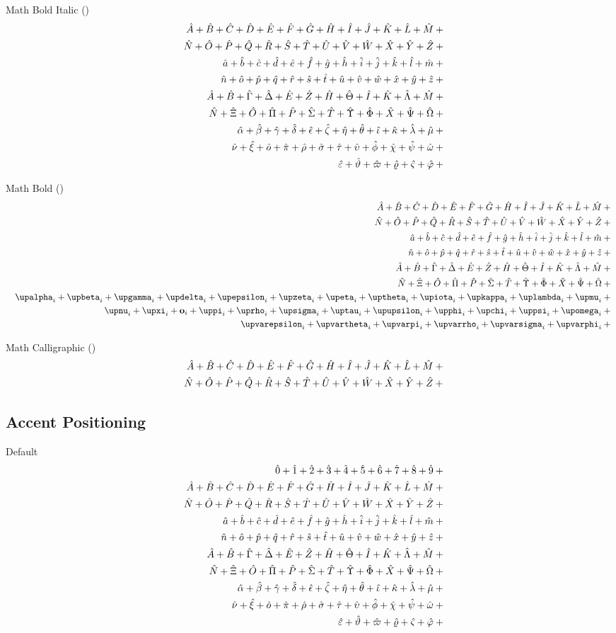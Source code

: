 \documentclass[11pt, a4paper, oneside]{article}
\theoremstyle{Plain}
\theoremstyle{Definition}
\theoremstyle{Remark}
\begin{document}
\begin{appendix}
	Math Bold Italic (\texttt{\string\bm})
	\def\test#1{\bm{#1}_{i}+{}}%
	\begin{eqnarray*}
	  && {\testupperi}\\
	  && {\testupperii}\\
	  && {\testloweri}\\
	  && {\testlowerii}\\
	  && {\testupgreeki}\\
	  && {\testupgreekii}\\
	  && {\testlowgreeki}\\
	  && {\testlowgreekii}\\
	  && {\testlowgreekiii}
	\end{eqnarray*}

	Math Bold (\texttt{\string\mathbf})
	\def\test#1{\mathbf{#1}_{i}+{}}%
	\begin{eqnarray*}
	  && {\testupperi}\\
	  && {\testupperii}\\
	  && {\testloweri}\\
	  && {\testlowerii}\\
	  && {\testupgreeki}\\
	  && {\testupgreekii}\\
	  && {\def\test#1{\bm{\mathbf{#1}}_{i}+{}}\testlowgreekupi}\\
	  && {\def\test#1{\bm{\mathbf{#1}}_{i}+{}}\testlowgreekupii}\\
	  && {\def\test#1{\bm{\mathbf{#1}}_{i}+{}}\testlowgreekupiii}
	\end{eqnarray*}%

	Math Calligraphic (\texttt{\string\mathcal})
	\def\test#1{\mathcal{#1}_{i}+{}}%
	\begin{eqnarray*}
	  && {\testupperi}\\
	  && {\testupperii}
	\end{eqnarray*}%

	\subsection{Accent Positioning \showfamily}

	Default
	\def\test#1{\hat{#1}+{}}%
	\begin{eqnarray*}
	  && {\testnums}\\
	  && {\testupperi}\\
	  && {\testupperii}\\
	  && {\testloweri}\\
	  && {\testlowerii}\\
	  && {\testupgreeki}\\
	  && {\testupgreekii}\\
	  && {\testlowgreeki}\\
	  && {\testlowgreekii}\\
	  && {\testlowgreekiii}
	\end{eqnarray*}%


\end{appendix}
\end{document}
